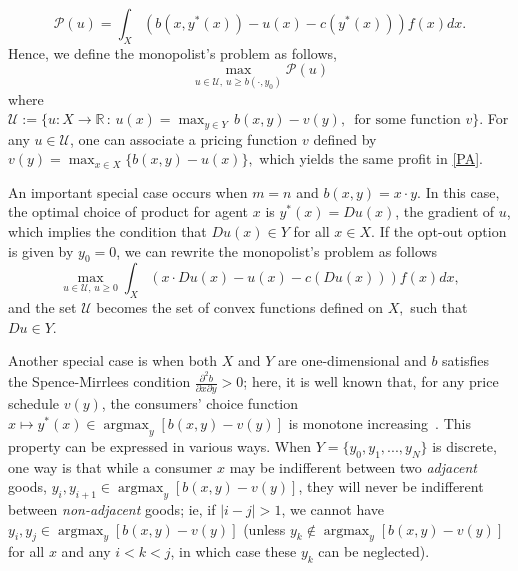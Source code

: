 \documentclass[12pt,reqno]{amsart}
\newcommand{\AM}{\operatorname{argmax}}
\begin{document}
\[\mathcal{P}(u)=\int_X (b(x,y^*(x))-u(x)-c(y^*(x)))f(x)dx.\] Hence, we define the monopolist's problem as follows,
\begin{equation}\label{PA}
\max_{u\in\mathcal{U},\, u\ge b(\cdot,y_0)}\mathcal{P}(u)
\end{equation}
where $\mathcal{U}:=\{u: X \rightarrow \mathbb{R}\,: \, u(x)=\max_{y\in Y} \,b(x,y)-v(y),\,\text{ for some function } v \}.$ %
\noindent 
For any $u \in \mathcal{U}$, one can associate a pricing function $v$ defined by $v(y)=\max_{x\in X}\{ b(x,y)-u(x)\},$ which yields the same profit in \eqref{PA}.



An important special case occurs when $m=n$ and $b(x,y)=x\cdot y.$ In this case, the optimal choice of product for agent $x$ is  $y^*(x)=Du(x)$, the gradient of $u$, %
which implies the condition that $Du(x)\in Y$  for all $x\in X.$ If the opt-out option is given by $y_0=0$, we can rewrite the monopolist's problem as follows
\[\max_{u\in\mathcal{U},\, u\ge0}\int_X (x\cdot Du(x)-u(x)-c(Du(x)))f(x)dx,\]
and the set $\mathcal{U}$ becomes the set of convex functions defined on $X,$ such that $Du\in Y.$



Another special case is when both $X$ and $Y$ are one-dimensional and $b$ satisfies the Spence-Mirrlees condition $\frac{\partial^2b}{\partial x \partial y} >0$; here, it is well known that, for any price schedule $v(y)$, the consumers' choice function $x \mapsto y^*(x) \in \AM_y [b(x,y)-v(y)]$ is monotone increasing~\cite{basov-book}.  This property can be expressed in various ways.  When $Y=\{y_0,y_1,...,y_N\}$ is discrete, one  way is that while a consumer $x$ may be indifferent between two \emph{adjacent} goods, $y_i, y_{i+1} \in \AM_y [b(x,y)-v(y)]$, they will never be indifferent between \emph{non-adjacent} goods; ie, if $|i-j| >1$, we cannot have $y_i, y_{j} \in \AM_y [b(x,y)-v(y)]$ (unless $y_k \notin \AM_y [b(x,y)-v(y)]$ for all $x$ and any $i<k<j$, in which case these $y_k$ can be neglected).  %

%
\end{document}
